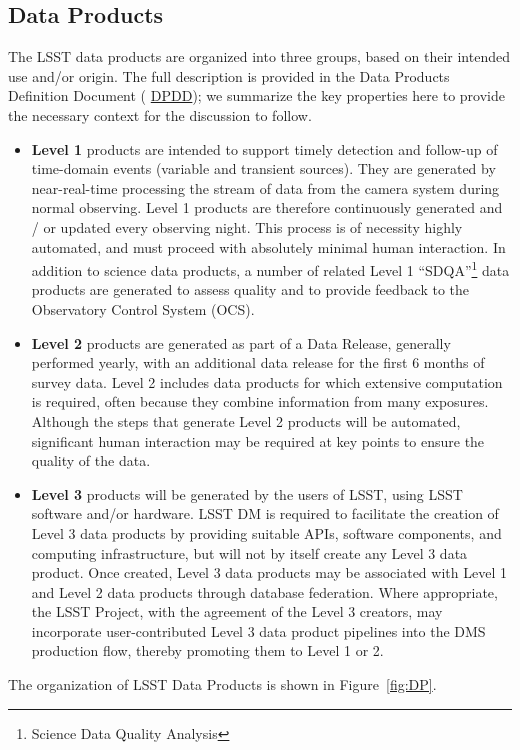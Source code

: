 \documentclass[12pt]{article}
\newcommand{\ds}[2]{{\color{blue} \href{https://docushare.lsstcorp.org/docushare/dsweb/Get/#1}{#2}}\xspace}
\newcommand{\DPDD}{\ds{LSE-163}{DPDD}}
\begin{document}
\subsection{Data Products}

The LSST data products are organized into three groups, based on their intended use and/or origin. The full description is provided in the Data Products Definition Document (\DPDD); we summarize the key properties here to provide the necessary context for the discussion to follow. 

\begin{itemize}
\item {\bf Level 1} products are intended to support timely detection and follow-up
  of time-domain events (variable and transient sources). They are generated by
  near-real-time processing the stream of data from the camera system during 
  normal observing.  Level 1 products are therefore continuously generated and / or
  updated every observing night. This process is of necessity highly
  automated, and must proceed with absolutely minimal human
  interaction.  In addition to science data products, a number of related
  Level 1 ``SDQA''\footnote{Science Data Quality Analysis} data products are generated
  to assess quality and to provide feedback to the Observatory Control System (OCS).

\item {\bf Level 2} products are generated as part of a Data Release, generally
  performed 
  yearly, with an additional data release for the first 6 months of survey data. 
  Level 2 includes data products for which extensive
  computation is required, often because they combine information from
  many exposures.  Although the steps that generate Level 2 products
  will be automated, significant human interaction may be required at
  key points to ensure the quality of the data.

\item {\bf Level 3} products will be generated by the users of LSST, using LSST 
  software and/or hardware.  LSST DM is required to facilitate the creation of 
  Level 3 data products by providing suitable APIs, software components, and
  computing infrastructure, but will not by itself create any Level 3
  data product. Once created, Level 3 data products may be associated with 
  Level 1 and Level 2 data products through database federation.
  Where appropriate, the LSST Project, with the agreement of the Level 3
  creators, may incorporate user-contributed Level 3 data product pipelines
  into the DMS production flow, thereby promoting them to Level 1 or 2.

\end{itemize}
%
The organization of LSST Data Products is shown in Figure~\ref{fig:DP}.
\end{document}

